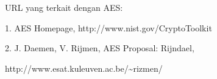 \documentclass{article}
\begin{document}

URL yang terkait dengan AES: 

1. AES Homepage, http://www.nist.gov/CryptoToolkit 

2. J. Daemen, V. Rijmen, AES Proposal: Rijndael, 

http://www.esat.kuleuven.ac.be/\textasciitilde{}rizmen/
\end{document}

